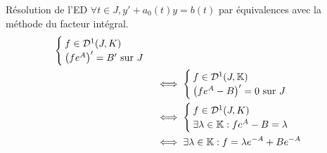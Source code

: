 \documentclass{article}
\begin{document}
\begin{question_kholle}{Résolution de l'ED  $\forall t \in J, y' + a_{0}(t)y = b(t)$ par équivalences avec la méthode du facteur intégral.}
\begin{align*}
\begin{cases}
                                                                                                                                   f\in\mathcal{D}^1(J,K) \\
                                                                                                                                   \left(f e^{A}\right)' = B' \text{ sur } J
                                                                                                                                 \end{cases}                                                                                                                          \\
                                                                                                                          & \iff \begin{cases}
                                                                                                                                   f\in\mathcal{D}^1(J,\K) \\
                                                                                                                                   \left(f e^{A}-B\right)' = 0 \text{ sur } J
                                                                                                                                 \end{cases}                                                                                                                         \\
                                                                                                                          & \iff \begin{cases}
                                                                                                                                   f\in\mathcal{D}^{1}(J,K) \\
                                                                                                                                   \exists \lambda\in\K: f e^{A}-B=\lambda
                                                                                                                                 \end{cases}                                                                                                                            \\
                                                                                                                          & \iff \exists \lambda\in\K: f=\lambda e^{-A}+B e^{-A}                                                                                                                   \\

\end{align*}
\end{question_kholle}
\end{document}
